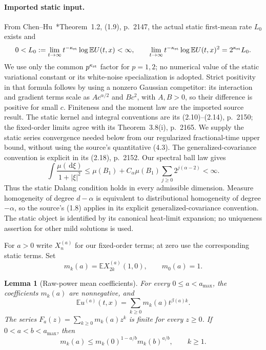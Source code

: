 \documentclass[12pt]{article}
\numberwithin{equation}{section}
\newtheorem{lemma}[theorem]{Lemma}
\theoremstyle{definition}
\newcommand{\E}{\mathbb{E}}
\newcommand{\ud}{\,\mathrm{d}}
\begin{document}
\paragraph{Imported static input.}
From Chen--Hu~\cite{chen.hu:25:hyperbolic}*{Theorem~1.2, (1.9), p.~2147},
the actual static first-mean rate $L_0$ exists and
\begin{equation}\label{E:static-ratio-input}
  0<L_0:=\lim_{t\to\infty}t^{-\kappa_{\rm st}}\log\E U(t,x)<\infty,
  \qquad
  \lim_{t\to\infty}t^{-\kappa_{\rm st}}\log\E U(t,x)^2
  =2^{\kappa_{\rm st}}L_0.
\end{equation}
We use only the common $p^{\kappa_{\rm st}}$ factor for $p=1,2$;
no numerical value of the static variational constant or its white-noise
specialization is adopted. Strict positivity in that formula follows by
using a nonzero Gaussian competitor: its interaction and gradient terms
scale as $A c^{\alpha/2}$ and $B c^2$, with $A,B>0$, so their difference
is positive for small $c$. Finiteness and the moment law are the imported
source result. The static kernel and integral conventions are its
(2.10)--(2.14), p.~2150; the fixed-order limits agree with its
Theorem~3.8(i), p.~2165. We supply the static series convergence needed
below from our regularized fractional-time upper bound, without using
the source's quantitative (4.3). The generalized-covariance convention is explicit
in its (2.18), p.~2152. Our spectral ball law gives
\[
  \int\frac{\mu(\ud\xi)}{1+|\xi|^2}
  \le\mu(B_1)+C_\alpha\mu(B_1)\sum_{j\ge0}2^{j(\alpha-2)}<\infty.
\]
Thus the static Dalang condition holds in every admissible dimension.
Measure homogeneity of degree $d-\alpha$ is equivalent to distributional
homogeneity of degree $-\alpha$, so the source's (1.8) applies in its
explicit generalized-covariance convention. The static object is identified
by its canonical heat-limit expansion; no uniqueness assertion for other
mild solutions is used.

For $a>0$ write $X_n^{(a)}$ for our fixed-order terms; at zero use the
corresponding static terms. Set
\[
  m_k(a)=\E X_{2k}^{(a)}(1,0),\qquad m_0(a)=1.
\]

\begin{lemma}[Raw-power mean coefficients]\label{L:mean-coefficient-holder}
  For every $0\le a<a_{\max}$, the coefficients $m_k(a)$ are nonnegative,
  and
  \begin{equation}\label{E:mean-positive-series}
    \E u^{(a)}(t,x)=\sum_{k\ge0}m_k(a)t^{\beta(a)k}.
  \end{equation}
  The series $F_a(z)=\sum_{k\ge0}m_k(a)z^k$ is finite for every $z\ge0$.
  If $0<a<b<a_{\max}$, then
  \begin{equation}\label{E:mean-coefficient-holder}
    m_k(a)\le m_k(0)^{1-a/b}m_k(b)^{a/b},\qquad k\ge1.
  \end{equation}
\end{lemma}
\end{document}
